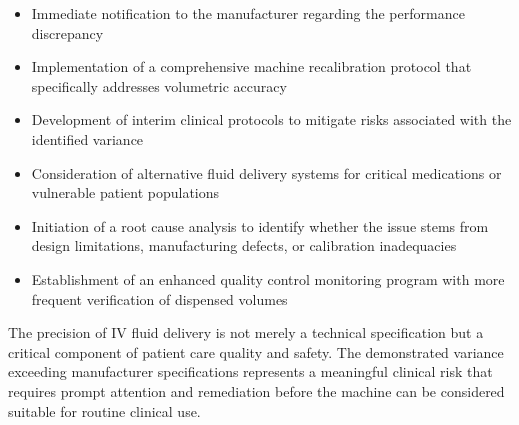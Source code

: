 \documentclass[12pt]{article}
\begin{document}
\begin{itemize}
    \item Immediate notification to the manufacturer regarding the performance discrepancy
    \item Implementation of a comprehensive machine recalibration protocol that specifically addresses volumetric accuracy
    \item Development of interim clinical protocols to mitigate risks associated with the identified variance
    \item Consideration of alternative fluid delivery systems for critical medications or vulnerable patient populations
    \item Initiation of a root cause analysis to identify whether the issue stems from design limitations, manufacturing defects, or calibration inadequacies
    \item Establishment of an enhanced quality control monitoring program with more frequent verification of dispensed volumes
\end{itemize}

The precision of IV fluid delivery is not merely a technical specification but a critical component of patient care quality and safety. The demonstrated variance exceeding manufacturer specifications represents a meaningful clinical risk that requires prompt attention and remediation before the machine can be considered suitable for routine clinical use.
\end{document}
